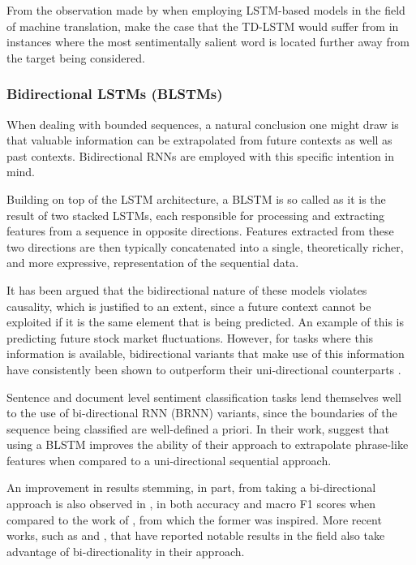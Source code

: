 \documentclass[../../fyp.tex]{subfiles}
\begin{document}
From the observation made by \citet{bahdanau2014} when employing LSTM-based models in the field of machine translation, \citet{chen2017} make the case that the TD-LSTM would suffer from in instances where the most sentimentally salient word is located further away from the target being considered.

\subsubsection{Bidirectional LSTMs (BLSTMs)}
When dealing with bounded sequences, a natural conclusion one  might draw is that valuable information can be extrapolated from future contexts as well as past contexts. Bidirectional RNNs are employed with this specific intention in mind.

Building on top of the LSTM architecture, a BLSTM is so called as it is the result of two stacked LSTMs, each responsible for processing and extracting features from a sequence in opposite directions. Features extracted from these two directions are then typically concatenated into a single, theoretically richer, and more expressive, representation of the sequential data.

It has been argued that the bidirectional nature of these models violates causality, which is justified to an extent, since a future context cannot be exploited if it is the same element that is being predicted. An example of this is predicting future stock market fluctuations. However, for tasks where this information is available, bidirectional variants that make use of this information have consistently been shown to outperform their uni-directional counterparts \citep{graves2012b}.

Sentence and document level sentiment classification tasks lend themselves well to the use of bi-directional RNN (BRNN) variants, since the boundaries of the sequence being classified are well-defined a priori. In their work, \citet{chen2017} suggest that using a BLSTM improves the ability of their approach to extrapolate phrase-like features when compared to a uni-directional sequential approach.

An improvement in results stemming, in part, from taking a bi-directional approach is also observed in \citep{zhang2016}, in both accuracy and macro F1 scores when compared to the work of \citep{vo2015}, from which the former was inspired. More recent works, such as \citet{ma2018} and \citet{zheng2018}, that have reported notable results in the field also take advantage of bi-directionality in their approach.
\end{document}
